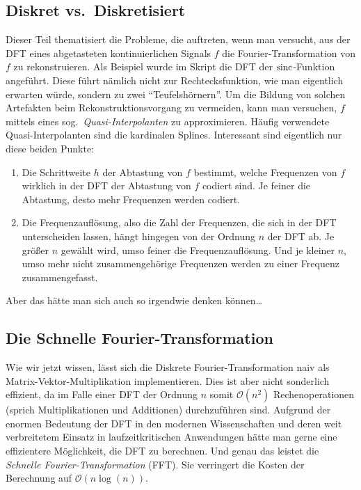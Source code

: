 \subsection{Diskret vs.\ Diskretisiert}
Dieser Teil thematisiert die Probleme, die auftreten, wenn man versucht, aus der DFT
eines abgetasteten kontinuierlichen Signals $ f $ die Fourier-Transformation von $ f $ zu 
rekonstruieren. Als Beispiel wurde im Skript die DFT der $ \operatorname{sinc} $-Funktion angeführt. Diese führt
nämlich nicht zur Rechtecksfunktion, wie man eigentlich erwarten würde, sondern zu zwei
\enquote{Teufelshörnern}. Um die Bildung von solchen Artefakten beim Rekonstruktionsvorgang zu 
vermeiden, kann man versuchen, $ f $ mittels eines sog.\ \emph{Quasi-Interpolanten} zu 
approximieren. Häufig verwendete Quasi-Interpolanten sind die kardinalen Splines. Interessant sind 
eigentlich nur diese beiden Punkte:
\begin{enumerate}
\item Die Schrittweite $ h $ der Abtastung von $ f $ bestimmt, welche Frequenzen von $ f $ wirklich
  in der DFT der Abtastung von $ f $ codiert sind. Je feiner die Abtastung, desto mehr Frequenzen 
  werden codiert.
\item Die Frequenzauflösung, also die Zahl der Frequenzen, die sich in der DFT unterscheiden lassen,
  hängt hingegen von der Ordnung $ n $ der DFT ab. Je größer $ n $ gewählt wird, umso feiner die
  Frequenzauflösung. Und je kleiner $ n $, umso mehr nicht zusammengehörige Frequenzen werden zu
  einer Frequenz zusammengefasst.
\end{enumerate}
Aber das hätte man sich auch so irgendwie denken können\dots

\subsection{Die Schnelle Fourier-Transformation}

Wie wir jetzt wissen, lässt sich die Diskrete Fourier-Transformation naiv als 
Matrix-Vektor-Multiplikation implementieren. Dies ist aber nicht sonderlich effizient, da im Falle
einer DFT der Ordnung $ n $ somit $ \mathcal{O}(n^{2}) $ Rechenoperationen (sprich Multiplikationen
und Additionen) durchzuführen sind. Aufgrund der enormen Bedeutung der DFT in den modernen
Wissenschaften und deren weit verbreitetem Einsatz in laufzeitkritischen Anwendungen hätte man 
gerne eine effizientere Möglichkeit, die DFT zu berechnen. Und genau das leistet die \emph{Schnelle 
Fourier-Transformation} (FFT). Sie verringert die Kosten der Berechnung auf
$ \mathcal{O}(n \log(n)) $.

